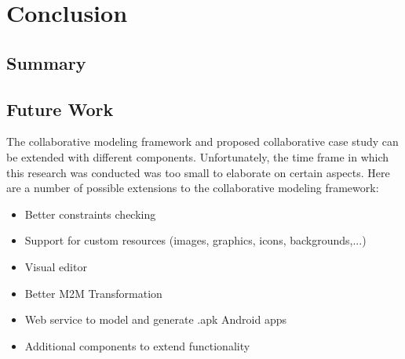\chapter{Conclusion}

\section{Summary}

\section{Future Work}

The collaborative modeling framework and proposed collaborative case study can be extended with different components. Unfortunately, the time frame in which this research was conducted was too small to elaborate on certain aspects. Here are a number of possible extensions to the collaborative modeling framework:

\begin{itemize}
\item{Better constraints checking}
\item{Support for custom resources (images, graphics, icons, backgrounds,...)}
\item{Visual editor}
\item{Better M2M Transformation}
\item{Web service to model and generate .apk Android apps}
\item{Additional components to extend functionality}
\end{itemize}
